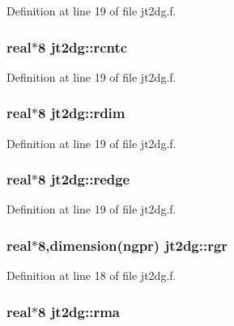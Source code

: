 Definition at line 19 of file jt2dg.f.\hypertarget{namespacejt2dg_c556fd21d38d2c16cf2084c07b3c0c20}{
\subsubsection[rcntc]{\setlength{\rightskip}{0pt plus 5cm}real$\ast$8 {\bf jt2dg::rcntc}}}
\label{namespacejt2dg_c556fd21d38d2c16cf2084c07b3c0c20}




Definition at line 19 of file jt2dg.f.\hypertarget{namespacejt2dg_b4ad724a904b761b05f1d0fe6ce382b8}{
\subsubsection[rdim]{\setlength{\rightskip}{0pt plus 5cm}real$\ast$8 {\bf jt2dg::rdim}}}
\label{namespacejt2dg_b4ad724a904b761b05f1d0fe6ce382b8}




Definition at line 19 of file jt2dg.f.\hypertarget{namespacejt2dg_b1344521a6c6c72af5caecd650ebe2f6}{
\subsubsection[redge]{\setlength{\rightskip}{0pt plus 5cm}real$\ast$8 {\bf jt2dg::redge}}}
\label{namespacejt2dg_b1344521a6c6c72af5caecd650ebe2f6}




Definition at line 19 of file jt2dg.f.\hypertarget{namespacejt2dg_b4d8b9997f9926f576c02a07ccc16176}{
\subsubsection[rgr]{\setlength{\rightskip}{0pt plus 5cm}real$\ast$8,dimension(ngpr) {\bf jt2dg::rgr}}}
\label{namespacejt2dg_b4d8b9997f9926f576c02a07ccc16176}




Definition at line 18 of file jt2dg.f.\hypertarget{namespacejt2dg_ab82ffdff1e4668d4385405aa75ccd89}{
\subsubsection[rma]{\setlength{\rightskip}{0pt plus 5cm}real$\ast$8 {\bf jt2dg::rma}}}
\label{namespacejt2dg_ab82ffdff1e4668d4385405aa75ccd89}




